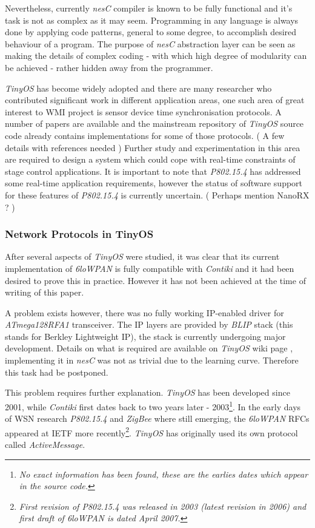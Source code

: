  Nevertheless, currently \emph{nesC} compiler is known to be fully
 functional and it's task is not as complex as it may seem. Programming
 in any language is always done by applying code patterns, general
 to some degree, to accomplish desired behaviour of a program.
 The purpose of \emph{nesC} abstraction layer can be seen as making
 the details of complex coding - with which high degree of modularity
 can be achieved - rather hidden away from the programmer.

  \emph{TinyOS} has become widely adopted and there are many researcher
 who contributed significant work in different application areas, one
 such area of great interest to WMI project is sensor device time
 synchronisation protocols. A number of papers are available and the
 mainstream repository of \emph{TinyOS} source code already contains
 implementations for some of those protocols.
 ( A few details with references needed )
  Further study and experimentation in this area are required to design
 a system which could cope with real-time constraints of stage control
 applications. It is important to note that \emph{P802.15.4} has addressed
 some real-time application requirements, however the status of software
 support for these features of \emph{P802.15.4} is currently uncertain.
 ( Perhaps mention NanoRX ? )

\subsubsection{Network Protocols in TinyOS}
 
  After several aspects of \emph{TinyOS} were studied, it was clear
 that its current implementation of \emph{6loWPAN} is fully compatible
 with \emph{Contiki} and it had been desired to prove this in practice.
 However it has not been achieved at the time of writing of this paper.
  
  A problem exists however, there was no fully working IP-enabled driver
 for \emph{ATmega128RFA1} transceiver. The IP layers are provided by
 \emph{BLIP} stack (this stands for Berkley Lightweight IP), the stack
 is currently undergoing major development. Details on what is required
 are available on \emph{TinyOS} wiki page \cite{tinyos:wiki:blip-2-0},
 implementing it in \emph{nesC} was not as trivial due to the learning
 curve. Therefore this task had be postponed.

  This problem requires further explanation. \emph{TinyOS} has been
 developed since 2001, while \emph{Contiki} first dates back to two
 years later - 2003\footnote{\emph{No exact information has been
 found, these are the earlies dates which appear in the source code.}}. 
 In the early days of WSN research \emph{P802.15.4} and \emph{ZigBee}
 where still emerging, the \emph{6loWPAN} RFCs appeared at IETF more
 recently\footnote{\emph{First revision of P802.15.4 was released in
 2003 (latest revision in 2006) and first draft of 6loWPAN is dated
 April 2007.}}. \emph{TinyOS} has originally used its own protocol
 called \emph{ActiveMessage}.

